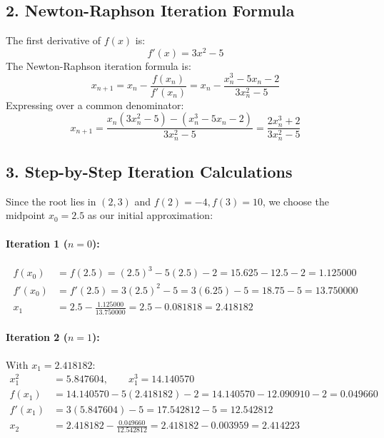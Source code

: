 \documentclass[11pt,a4paper]{article}
\begin{document}
\subsection*{2. Newton-Raphson Iteration Formula}
The first derivative of $f(x)$ is:
\begin{equation}
f'(x) = 3x^2 - 5
\end{equation}
The Newton-Raphson iteration formula is:
\begin{equation}
x_{n+1} = x_n - \frac{f(x_n)}{f'(x_n)} = x_n - \frac{x_n^3 - 5x_n - 2}{3x_n^2 - 5}
\end{equation}
Expressing over a common denominator:
\begin{equation}
x_{n+1} = \frac{x_n(3x_n^2 - 5) - (x_n^3 - 5x_n - 2)}{3x_n^2 - 5} = \frac{2x_n^3 + 2}{3x_n^2 - 5}
\end{equation}

\subsection*{3. Step-by-Step Iteration Calculations}
Since the root lies in $(2, 3)$ and $f(2) = -4, f(3) = 10$, we choose the midpoint $x_0 = 2.5$ as our initial approximation:

\paragraph{Iteration 1 ($n = 0$):}
\begin{align*}
f(x_0) &= f(2.5) = (2.5)^3 - 5(2.5) - 2 = 15.625 - 12.5 - 2 = 1.125000 \\
f'(x_0) &= f'(2.5) = 3(2.5)^2 - 5 = 3(6.25) - 5 = 18.75 - 5 = 13.750000 \\
x_1 &= 2.5 - \frac{1.125000}{13.750000} = 2.5 - 0.081818 = \mathbf{2.418182}
\end{align*}

\paragraph{Iteration 2 ($n = 1$):}
With $x_1 = 2.418182$:
\begin{align*}
x_1^2 &= 5.847604, \qquad x_1^3 = 14.140570 \\
f(x_1) &= 14.140570 - 5(2.418182) - 2 = 14.140570 - 12.090910 - 2 = 0.049660 \\
f'(x_1) &= 3(5.847604) - 5 = 17.542812 - 5 = 12.542812 \\
x_2 &= 2.418182 - \frac{0.049660}{12.542812} = 2.418182 - 0.003959 = \mathbf{2.414223}
\end{align*}
\end{document}

